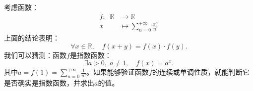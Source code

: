 \documentclass[12pt,UTF8]{ctexbook}
\begin{document}
考虑函数：
\begin{align*}
    f:\;\; \mathbb{R} &\rightarrow \mathbb{R} \\
    x &\mapsto \sum_{n=0}^{+\infty} \frac{x^n}{n!}
\end{align*}
上面的结论表明：
$$ \forall x \in \mathbb{R}, \quad f(x + y) = f(x) \cdot f(y). $$
我们可以猜测：函数$f$是指数函数：
$$ \exists a > 0, \; a\neq 1, \quad f(x) = a^x. $$
其中$a = f(1) = \sum_{n=0}^{+\infty} \frac{1}{n!}$。如果能够验证函数$f$的连续或单调性质，就能判断它是否确实是指数函数，并求出$a$的值。


\end{document}
